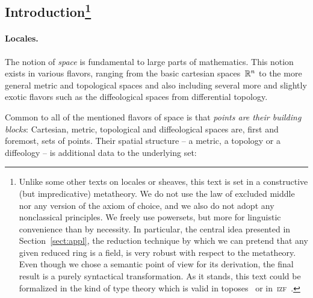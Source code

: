 \documentclass{ws-rv9x6}
\begin{document}
{\begin{abstract}
The purpose of this contribution is to give a coherent account of a particular
narrative which links locales, geometric theories, sheaf semantics and
constructive commutative algebra. We are hoping to convey a firm grasp of three
ideas:
(1)~Locales are a kind of space in which opens instead of points are
fundamental.
(2)~Sheaf semantics allows us to explore mathematical objects from custom-tailored
mathematical universes.
(3)~Without loss of generality, any reduced ring is a field.
\end{abstract}
\body

\tableofcontents

\subsection*{Introduction\footnote{
Unlike some other texts on locales or sheaves, this text is set in a
constructive (but impredicative) metatheory. We do not use the law of excluded
middle nor any version of the axiom of choice, and we also do not adopt any
nonclassical principles. We freely use powersets, but more for linguistic
convenience than by necessity.
In particular, the central idea presented in
Section~\ref{sect:appl}, the reduction technique by which we can pretend that any
given reduced ring is a field, is very robust with respect to the metatheory.
Even though we chose a semantic point of view for its derivation, the final
result is a purely syntactical transformation. As it stands, this text could be
formalized in the kind of type theory which is valid in
toposes~\cite{maietti:modular-correspondence} or
in~\textsc{izf}~\cite{crosilla:cst-izf}.}}


\paragraph{Locales.}

The notion of \emph{space} is fundamental to large parts of mathematics. This notion
exists in various flavors, ranging from the basic cartesian spaces~$\mathbb{R}^n$ to
the more general metric and topological spaces and also including several more
and slightly exotic flavors such as the diffeological spaces from differential topology.

Common to all of the mentioned flavors of space is that \emph{points are their
building blocks}: Cartesian, metric, topological and diffeological spaces are,
first and foremost, sets of points. Their spatial structure -- a metric, a
topology or a diffeology -- is additional data to the underlying set:

}
\end{document}
